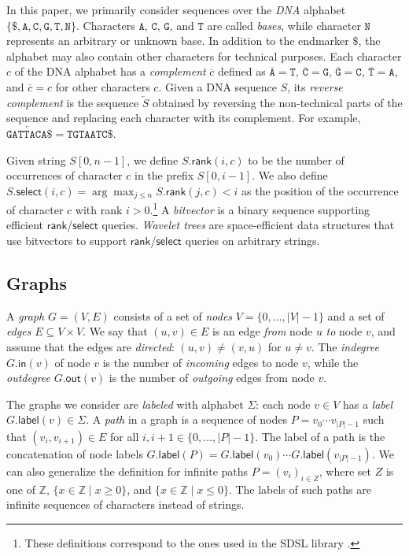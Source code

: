 \documentclass[a4paper,UKenglish]{lipics-v2016}
\newcommand{\set}[1]{\ensuremath{\{ #1 \}}}
\newcommand{\abs}[1]{\ensuremath{\lvert #1 \rvert}}
\newcommand{\dnaseq}[1]{\ensuremath{\mathtt{#1}}}
\newcommand{\baseA}{\dnaseq{A}}
\newcommand{\baseC}{\dnaseq{C}}
\newcommand{\baseG}{\dnaseq{G}}
\newcommand{\baseT}{\dnaseq{T}}
\newcommand{\baseN}{\dnaseq{N}}
\newcommand{\dnacomp}[1]{\ensuremath{\overline{#1}}}
\newcommand{\revcomp}[1]{\ensuremath{\overleftarrow{#1}}}
\newcommand{\rank}{\ensuremath{\mathsf{rank}}}
\newcommand{\select}{\ensuremath{\mathsf{select}}}
\newcommand{\gindegree}{\ensuremath{\mathsf{in}}}
\newcommand{\goutdegree}{\ensuremath{\mathsf{out}}}
\newcommand{\glabel}{\ensuremath{\mathsf{label}}}
\begin{document}
In this paper, we primarily consider sequences over the \emph{DNA} alphabet $\set{\$, \baseA, \baseC, \baseG, \baseT, \baseN}$. Characters $\baseA$, $\baseC$, $\baseG$, and $\baseT$ are called \emph{bases}, while character $\baseN$ represents an arbitrary or unknown base. In addition to the endmarker $\$$, the alphabet may also contain other characters for technical purposes. Each character $c$ of the DNA alphabet has a \emph{complement} $\dnacomp{c}$ defined as $\dnacomp{\baseA} = \baseT$, $\dnacomp{\baseC} = \baseG$, $\dnacomp{\baseG} = \baseC$, $\dnacomp{\baseT} = \baseA$, and $\dnacomp{c} = c$ for other characters $c$. Given a DNA sequence $S$, its \emph{reverse complement} is the sequence $\revcomp{S}$ obtained by reversing the non-technical parts of the sequence and replacing each character with its complement. For example, $\revcomp{\dnaseq{GATTACA}\$} = \dnaseq{TGTAATC}\$$.

Given string $S[0, n-1]$, we define $S.\rank(i, c)$ to be the number of occurrences of character $c$ in the prefix $S[0, i-1]$. We also define $S.\select(i, c) = \arg \max_{j \le n} S.\rank(j, c) < i$ as the position of the occurrence of character $c$ with rank $i > 0$.\footnote{These definitions correspond to the ones used in the SDSL library \cite{Gog2014b}.} A \emph{bitvector} is a binary sequence supporting efficient $\rank$/$\select$ queries. \emph{Wavelet trees} \cite{Grossi2003} are space-efficient data structures that use bitvectors to support $\rank$/$\select$ queries on arbitrary strings.

\subsection{Graphs}\label{sect:graphs}

A \emph{graph} $G = (V, E)$ consists of a set of \emph{nodes} $V = \set{0, \dotsc, \abs{V}-1}$ and a set of \emph{edges} $E \subseteq V \times V$. We say that $(u, v) \in E$ is an edge \emph{from} node $u$ \emph{to} node $v$, and assume that the edges are \emph{directed}: $(u, v) \ne (v, u)$ for $u \ne v$. The \emph{indegree} $G.\gindegree(v)$ of node $v$ is the number of \emph{incoming} edges to node $v$, while the \emph{outdegree} $G.\goutdegree(v)$ is the number of \emph{outgoing} edges from node $v$.

The graphs we consider are \emph{labeled} with alphabet $\Sigma$: each node $v \in V$ has a \emph{label} $G.\glabel(v) \in \Sigma$. A \emph{path} in a graph is a sequence of nodes $P = v_{0} \dotsm v_{\abs{P}-1}$ such that $(v_{i}, v_{i+1}) \in E$ for all $i, i+1 \in \set{0, \dotsc, \abs{P}-1}$. The label of a path is the concatenation of node labels $G.\glabel(P) = G.\glabel(v_{0}) \dotsm G.\glabel(v_{\abs{P}-1})$. We can also generalize the definition for infinite paths $P = (v_{i})_{i \in Z}$, where set $Z$ is one of $\mathbb{Z}$, $\set{x \in \mathbb{Z} \mid x \ge 0}$, and $\set{x \in \mathbb{Z} \mid x \le 0}$. The labels of such paths are infinite sequences of characters instead of strings.
\end{document}
